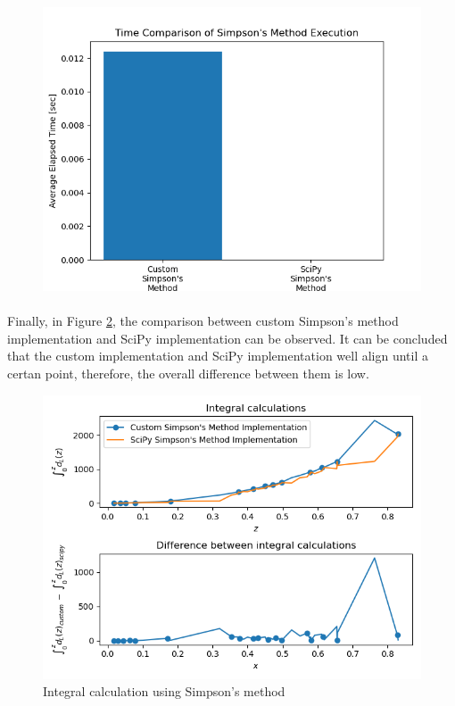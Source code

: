 \documentclass[letterpaper,12pt]{article}
\begin{document}
\begin{figure}[H]
\centerline{\includegraphics[width=1.0\linewidth]{figures/16-3.png}}
\caption{}
\label{fig:16-3}
\end{figure}

\paragraph{} Finally, in Figure \ref{fig:16-4}, the comparison between custom Simpson's method implementation and SciPy implementation can be observed. It can be concluded that the custom implementation and SciPy implementation well align until a certan point, therefore, the overall difference between them is low.
\begin{figure}[H]
\centerline{\includegraphics[width=\linewidth]{figures/16-4.png}}
\caption{Integral calculation using Simpson's method}
\label{fig:16-4}
\end{figure}
\end{document}
